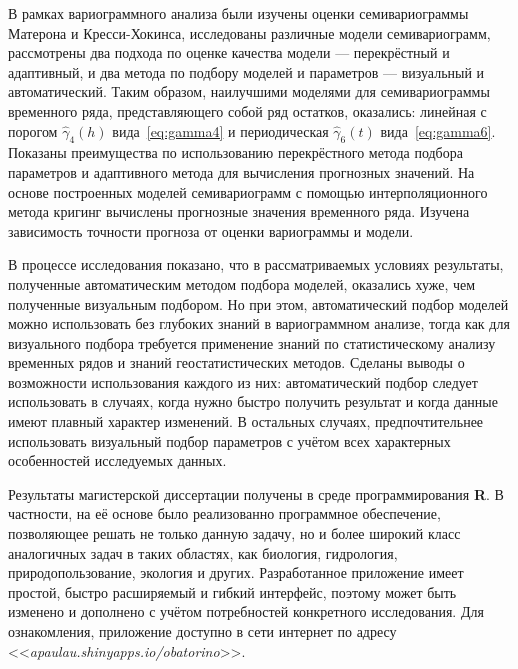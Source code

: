 В рамках вариограммного анализа были изучены оценки семивариограммы Матерона и Кресси-Хокинса, исследованы различные модели семивариограмм, рассмотрены два подхода по оценке качества модели --- перекрёстный и адаптивный, и два метода по подбору моделей и параметров --- визуальный и автоматический. Таким образом, наилучшими моделями для семивариограммы временного ряда, представляющего собой ряд остатков, оказались: линейная с порогом $ \widehat{\gamma}_4(h) $ вида~\eqref{eq:gamma4} и периодическая $\widehat{\gamma}_6(t) $ вида~\eqref{eq:gamma6}. Показаны преимущества по использованию перекрёстного метода подбора параметров и адаптивного метода для вычисления прогнозных значений. На основе построенных моделей семивариограмм с помощью интерполяционного метода кригинг вычислены прогнозные значения временного ряда. Изучена зависимость точности прогноза от оценки вариограммы и модели.

В процессе исследования показано, что в рассматриваемых условиях результаты, полученные автоматическим методом подбора моделей, оказались хуже, чем полученные визуальным подбором. Но при этом, автоматический подбор моделей можно использовать без глубоких знаний в вариограммном анализе, тогда как для визуального подбора требуется применение знаний по статистическому анализу временных рядов и знаний геостатистических методов. Сделаны выводы о возможности использования каждого из них: автоматический подбор следует использовать в случаях, когда нужно быстро получить результат и когда данные имеют плавный характер изменений. В остальных случаях, предпочтительнее использовать визуальный подбор параметров с учётом всех характерных особенностей исследуемых данных.

Результаты магистерской диссертации получены в среде программирования \textbf{R}. В частности, на её основе было реализованно программное обеспечение, позволяющее решать не только данную задачу, но и более широкий класс аналогичных задач в таких областях, как биология, гидрология, природопользование, экология и других. Разработанное приложение имеет простой, быстро расширяемый и гибкий интерфейс, поэтому может быть изменено и дополнено с учётом потребностей конкретного исследования. Для ознакомления, приложение доступно в сети интернет по адресу <<\textit{apaulau.shinyapps.io/obatorino}>>.
